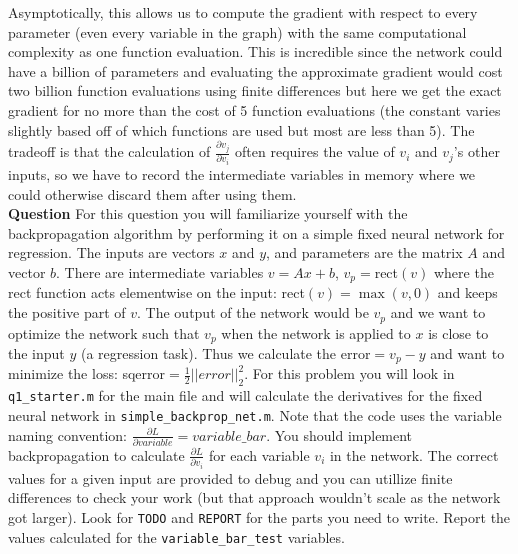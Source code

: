 \documentclass{article}
\begin{document}
Asymptotically, this allows us to compute the gradient with respect to every parameter (even every variable in the graph) with the same computational complexity as one function evaluation.
This is incredible since the network could have a billion of parameters and evaluating the approximate gradient would cost two billion function evaluations using finite differences but here we 
get the exact gradient for no more than the cost of 5 function evaluations (the constant varies slightly based off of which functions are used but most are less than 5).
The tradeoff is that the calculation of $\frac{\partial v_j}{\partial v_i}$ often requires the value of $v_i$ and $v_j$'s other inputs, so we have to record the intermediate variables in memory
where we could otherwise discard them after using them.
\\

{\bf Question} For this question you will familiarize yourself with the backpropagation algorithm by performing it on a simple fixed neural network for regression.
The inputs are vectors $x$ and $y$, and parameters are the matrix $A$ and vector $b$.
There are intermediate variables $v = A x + b$, $v_p = $rect$(v)$ where the rect function acts elementwise on the input: rect$(v) = \max(v, 0)$ and keeps the positive part of $v$.
The output of the network would be $v_p$ and we want to optimize the network such that $v_p$ when the network is applied to $x$ is close to the input $y$ (a regression task).
Thus we calculate the error$ = v_p - y$ and want to minimize the loss: sqerror$ = \frac{1}{2}||error||_2^2$.
For this problem you will look in \verb|q1_starter.m| for the main file and will calculate the derivatives for the fixed neural network in \verb|simple_backprop_net.m|.
Note that the code uses the variable naming convention: $\frac{\partial L}{\partial variable} = variable\_bar$.
You should implement backpropagation to calculate $\frac{\partial L}{\partial v_i}$ for each variable $v_i$ in the network.
The correct values for a given input are provided to debug and you can utillize finite differences to check your work (but that approach wouldn't scale as the network got larger).
Look for \verb|TODO| and \verb|REPORT| for the parts you need to write.
Report the values calculated for the \verb|variable_bar_test| variables.
\\



\end{document}
